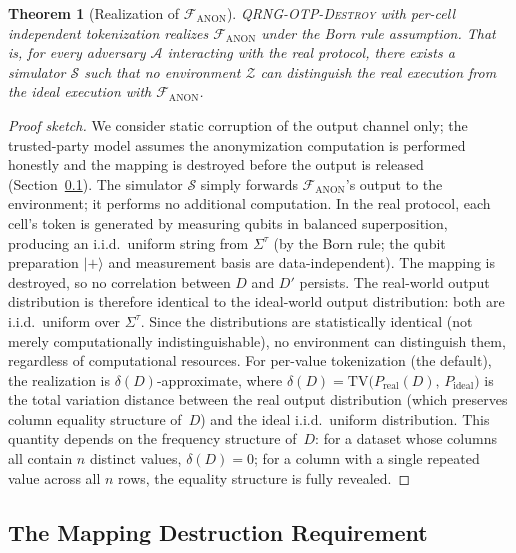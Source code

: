 \documentclass[journal]{IEEEtran}
\newtheorem{theorem}{Theorem}
\begin{document}
\begin{theorem}[Realization of $\mathcal{F}_{\mathrm{ANON}}$]
\label{thm:uc-realization}
\textsc{QRNG-OTP-Destroy} with per-cell independent tokenization realizes $\mathcal{F}_{\mathrm{ANON}}$ under the Born rule assumption. That is, for every adversary $\mathcal{A}$ interacting with the real protocol, there exists a simulator $\mathcal{S}$ such that no environment $\mathcal{Z}$ can distinguish the real execution from the ideal execution with $\mathcal{F}_{\mathrm{ANON}}$.
\end{theorem}

\begin{proof}[Proof sketch]
We consider static corruption of the output channel only; the trusted-party model assumes the anonymization computation is performed honestly and the mapping is destroyed before the output is released (Section~\ref{subsec:destruction}). The simulator $\mathcal{S}$ simply forwards $\mathcal{F}_{\mathrm{ANON}}$'s output to the environment; it performs no additional computation. In the real protocol, each cell's token is generated by measuring qubits in balanced superposition, producing an i.i.d.\ uniform string from $\Sigma^\tau$ (by the Born rule; the qubit preparation $|{+}\rangle$ and measurement basis are data-independent). The mapping is destroyed, so no correlation between $D$ and $D'$ persists. The real-world output distribution is therefore identical to the ideal-world output distribution: both are i.i.d.\ uniform over $\Sigma^\tau$. Since the distributions are statistically identical (not merely computationally indistinguishable), no environment can distinguish them, regardless of computational resources. For per-value tokenization (the default), the realization is $\delta(D)$-approximate, where $\delta(D) = \mathrm{TV}\bigl(P_{\mathrm{real}}(D),\, P_{\mathrm{ideal}}\bigr)$ is the total variation distance between the real output distribution (which preserves column equality structure of~$D$) and the ideal i.i.d.\ uniform distribution. This quantity depends on the frequency structure of~$D$: for a dataset whose columns all contain $n$ distinct values, $\delta(D) = 0$; for a column with a single repeated value across all $n$ rows, the equality structure is fully revealed.
\end{proof}

\subsection{The Mapping Destruction Requirement}
\label{subsec:destruction}
\end{document}
